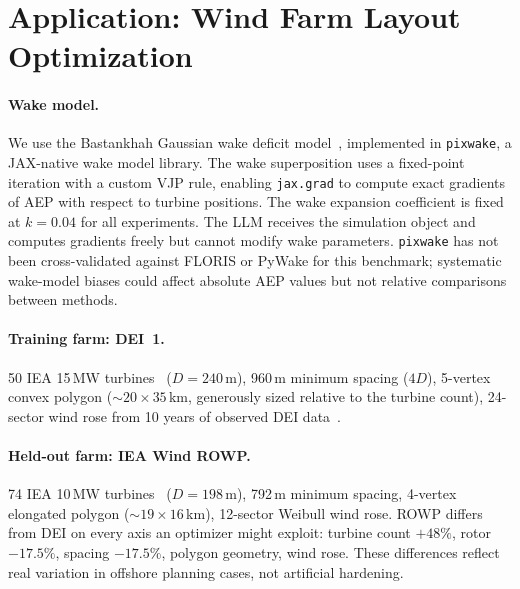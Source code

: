 \section{Application: Wind Farm Layout Optimization}
\label{sec:application}

\paragraph{Wake model.}
We use the Bastankhah Gaussian wake deficit
model~\cite{bastankhah2014new}, implemented in \texttt{pixwake}, a
JAX-native wake model library. The wake superposition uses a
fixed-point iteration with a custom VJP rule, enabling
\texttt{jax.grad} to compute exact gradients of AEP with respect to
turbine positions. The wake expansion coefficient is fixed at
$k=0.04$ for all experiments. The LLM receives the simulation
object and computes gradients freely but cannot modify wake
parameters. \texttt{pixwake} has not been cross-validated against
FLORIS or PyWake for this benchmark; systematic wake-model biases
could affect absolute AEP values but not relative comparisons
between methods.

\paragraph{Training farm: DEI~1.}
50 IEA 15\,MW turbines~\cite{gaertner2020iea15mw}
($D=240$\,m), 960\,m minimum spacing ($4D$), 5-vertex convex
polygon ($\sim$$20\!\times\!35$\,km, generously sized relative to
the turbine count), 24-sector wind rose from 10 years of observed
DEI data~\cite{energinet2022dei}.

\paragraph{Held-out farm: IEA Wind ROWP.}
74 IEA 10\,MW turbines~\cite{borrassunyeriea2024rowp,bortolotti2019iea10mw}
($D=198$\,m), 792\,m minimum spacing, 4-vertex elongated polygon
($\sim$$19\!\times\!16$\,km), 12-sector Weibull wind rose. ROWP
differs from DEI on every axis an optimizer might exploit:
turbine count $+48\%$, rotor $-17.5\%$, spacing $-17.5\%$, polygon
geometry, wind rose. These differences reflect real variation in
offshore planning cases, not artificial hardening.


